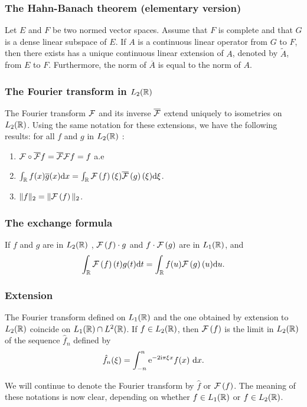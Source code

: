 \begin{frame}
\frametitle{The Hahn-Banach theorem (elementary version)}
\begin{theorem}
 Let $E$  and $F$ be two normed vector spaces. Assume that $F$ is complete and that $G$ is a dense linear subspace of $E$. 
 If $A$ is a continuous linear operator from $G$ to $F$, then there exists has a unique continuous linear extension of $A$,  denoted by $\tilde{A}$, from $E$  to $F$. Furthermore, the norm of $\overline{A}$ is equal to the norm of $A$.
\end{theorem}
\end{frame}

\begin{frame}
\frametitle{The Fourier transform in $L_2(\mathbb{R})$}
\begin{theorem}
The Fourier transform $\mathcal{F}$ and its inverse $\overline{\mathcal{F}}$ extend uniquely to isometries on $L_2(\mathbb{R})$. Using the same notation for these extensions, we have the following results: for all $f$  and $g$ in $L_2(\mathbb{R})$ :
\begin{enumerate}[label=(\roman*)]
\item $\mathcal{F} \circ \overline{\mathcal{F}} f= \overline{\mathcal{F}} \mathcal{F} f = f$ a.e
\item $\int_{\mathbb{R}}f(x)\overline{g}(x) \mathrm{d} x=\int_{\mathbb{R}} \mathcal{F}\left( f \right)(\xi) \overline{\mathcal{F}}\left( g \right)(\xi)  \mathrm{d} \xi$. 
\item  $\Vert f\Vert_{2}=\Vert \mathcal{F}\left( f \right) \Vert_{2}$.
\end{enumerate}
\end{theorem}
\end{frame}

\begin{frame}
\frametitle{The exchange formula}
\begin{theorem}
If $f$ and $g$  are in $L_2(\mathbb{R})$ , $\mathcal{F}\left( f \right) \cdot g$ and $f\cdot \mathcal{F}\left( g \right)$ are in $L_1(\mathbb{R})$, and
$$
\int_{\mathbb{R}} \mathcal{F}\left( f \right)(t)g(t) \mathrm{d} t=\int_{\mathbb{R}} f(u) \mathcal{F}\left( g \right)(u) \mathrm{d} u.
$$
\end{theorem}
\end{frame}

\begin{frame}
\frametitle{Extension}
\begin{theorem}
The Fourier transform defined on $L_1(\mathbb{R})$  and the one obtained by extension to $L_2(\mathbb{R})$  coincide on $L_1(\mathbb{R})\cap L^{2}(\mathbb{R})$. If $ f\in L_2(\mathbb{R})$,  then $\mathcal{F}\left( f \right)$  is the limit in $L_2(\mathbb{R})$  of the sequence $\hat{f}_{n}$ defined by
$$
\hat{f}_{n}(\xi)=\int_{-n}^{n} \mathrm{e}^{-2\mathrm{i} \pi\xi x}f(x)\ \mathrm{d} x.
$$
\end{theorem}
We will continue to denote the Fourier transform by $\hat{f}$ or $\mathcal{F}\left( f \right)$. The meaning of these notations is now clear, depending on whether $ f\in L_1(\mathbb{R})$ or $ f\in L_2(\mathbb{R})$.
\end{frame}

